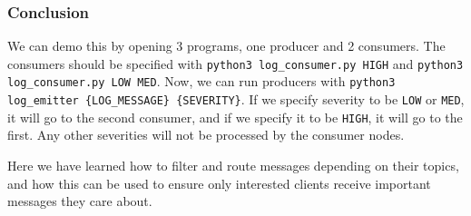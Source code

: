 \documentclass{article}
\begin{document}
\subsubsection{Conclusion}

We can demo this by opening 3 programs, one producer and 2 consumers. The consumers should be specified with \verb|python3 log_consumer.py HIGH| and \verb|python3 log_consumer.py LOW MED|. Now, we can run producers with \verb|python3 log_emitter {LOG_MESSAGE} {SEVERITY}|. If we specify severity to be \verb|LOW| or \verb|MED|, it will go to the second consumer, and if we specify it to be \verb|HIGH|, it will go to the first. Any other severities will not be processed by the consumer nodes. 

Here we have learned how to filter and route messages depending on their topics, and how this can be used to ensure only interested clients receive important messages they care about.
\end{document}
